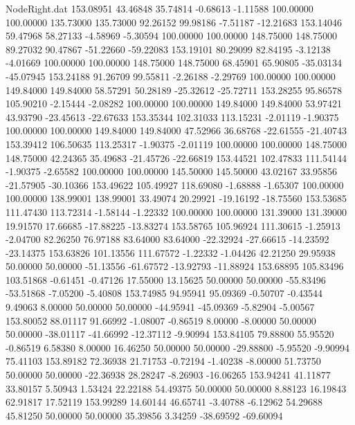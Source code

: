 \begin{filecontents}{NodeRight.dat}
 153.08951   43.46848   35.74814    -0.68613   -1.11588  100.00000  100.00000  135.73000  135.73000   92.26152   99.98186   -7.51187  -12.21683
 153.14046   59.47968   58.27133    -4.58969   -5.30594  100.00000  100.00000  148.75000  148.75000   89.27032   90.47867  -51.22660  -59.22083
 153.19101   80.29099   82.84195    -3.12138   -4.01669  100.00000  100.00000  148.75000  148.75000   68.45901   65.90805  -35.03134  -45.07945
 153.24188   91.26709   99.55811    -2.26188   -2.29769  100.00000  100.00000  149.84000  149.84000   58.57291   50.28189  -25.32612  -25.72711
 153.28255   95.86578  105.90210    -2.15444   -2.08282  100.00000  100.00000  149.84000  149.84000   53.97421   43.93790  -23.45613  -22.67633
 153.35344  102.31033  113.15231    -2.01119   -1.90375  100.00000  100.00000  149.84000  149.84000   47.52966   36.68768  -22.61555  -21.40743
 153.39412  106.50635  113.25317    -1.90375   -2.01119  100.00000  100.00000  148.75000  148.75000   42.24365   35.49683  -21.45726  -22.66819
 153.44521  102.47833  111.54144    -1.90375   -2.65582  100.00000  100.00000  145.50000  145.50000   43.02167   33.95856  -21.57905  -30.10366
 153.49622  105.49927  118.69080    -1.68888   -1.65307  100.00000  100.00000  138.99001  138.99001   33.49074   20.29921  -19.16192  -18.75560
 153.53685  111.47430  113.72314    -1.58144   -1.22332  100.00000  100.00000  131.39000  131.39000   19.91570   17.66685  -17.88225  -13.83274
 153.58765  105.96924  111.30615    -1.25913   -2.04700   82.26250   76.97188   83.64000   83.64000  -22.32924  -27.66615  -14.23592  -23.14375
 153.63826  101.13556  111.67572    -1.22332   -1.04426   42.21250   29.95938   50.00000   50.00000  -51.13556  -61.67572  -13.92793  -11.88924
 153.68895  105.83496  103.51868    -0.61451   -0.47126   17.55000   13.15625   50.00000   50.00000  -55.83496  -53.51868   -7.05200   -5.40808
 153.74985   94.95941   95.09369    -0.50707   -0.43544    9.49063    8.00000   50.00000   50.00000  -44.95941  -45.09369   -5.82904   -5.00567
 153.80052   88.01117   91.66992    -1.08007   -0.86519    8.00000   -8.00000   50.00000   50.00000  -38.01117  -41.66992  -12.37112   -9.90994
 153.84105   79.88800   55.95520    -0.86519    6.58380    8.00000   16.46250   50.00000   50.00000  -29.88800   -5.95520   -9.90994   75.41103
 153.89182   72.36938   21.71753    -0.72194   -1.40238   -8.00000   51.73750   50.00000   50.00000  -22.36938   28.28247   -8.26903  -16.06265
 153.94241   41.11877   33.80157     5.50943    1.53424   22.22188   54.49375   50.00000   50.00000    8.88123   16.19843   62.91817   17.52119
 153.99289   14.60144   46.65741    -3.40788   -6.12962   54.29688   45.81250   50.00000   50.00000   35.39856    3.34259  -38.69592  -69.60094

\end{filecontents}
